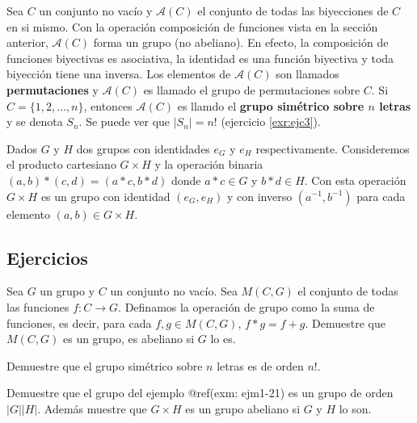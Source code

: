 \documentclass[12pt,]{krantz}
\theoremstyle{definition}
\theoremstyle{definition}
\theoremstyle{definition}
\theoremstyle{remark}
\let\BeginKnitrBlock\begin \let\EndKnitrBlock\end
\begin{document}
\BeginKnitrBlock{example}
\protect\hypertarget{exm:unnamed-chunk-57}{}{\label{exm:unnamed-chunk-57}
}Sea \(C\) un conjunto no vacío y \(\mathcal{A}(C)\) el conjunto de
todas las biyecciones de \(C\) en si mismo. Con la operación composición
de funciones vista en la sección anterior, \(\mathcal{A}(C)\) forma un
grupo (no abeliano). En efecto, la composición de funciones biyectivas
es asociativa, la identidad es una función biyectiva y toda biyección
tiene una inversa. Los elementos de \(\mathcal{A}(C)\) son llamados
\textbf{permutaciones} y \(\mathcal{A}(C)\) es llamado el grupo de
permutaciones sobre \(C\). Si \(C=\{1,2, ..., n\}\), entonces
\(\mathcal{A}(C)\) es llamdo el \textbf{grupo simétrico sobre \(n\)
letras} y se denota \(S_{n}\). Se puede ver que \(|S_{n}|=n!\)
(ejercicio \ref{exr:ejc3}).
\EndKnitrBlock{example}

\BeginKnitrBlock{example}
\protect\hypertarget{exm:ejm1-21}{}{\label{exm:ejm1-21} }Dados \(G\) y \(H\)
dos grupos con identidades \(e_{G}\) y \(e_{H}\) respectivamente.
Consideremos el producto cartesiano \(G\times H\) y la operación binaria
\((a,b)\ast (c,d)=(a\ast c,b\ast d)\) donde \(a\ast c\in G\) y
\(b\ast d\in H\). Con esta operación \(G\times H\) es un grupo con
identidad \((e_{G}, e_{H})\) y con inverso \((a^{-1}, b^{-1})\) para
cada elemento \((a,b)\in G\times H\).
\EndKnitrBlock{example}

\subsection{Ejercicios}\label{ejercicios-1}

\BeginKnitrBlock{exercise}
\protect\hypertarget{exr:unnamed-chunk-58}{}{\label{exr:unnamed-chunk-58}
}Sea \(G\) un grupo y \(C\) un conjunto no vacío. Sea \(M(C,G)\) el
conjunto de todas las funciones \(f:C\longrightarrow G\). Definamos la
operación de grupo como la suma de funciones, es decir, para cada
\(f,g\in M(C,G)\), \(f\ast g = f +g\). Demuestre que \(M(C,G)\) es un
grupo, es abeliano si \(G\) lo es.
\EndKnitrBlock{exercise}

\BeginKnitrBlock{exercise}
\protect\hypertarget{exr:ejc3}{}{\label{exr:ejc3} }Demuestre que el grupo
simétrico sobre \(n\) letras es de orden \(n!\).
\EndKnitrBlock{exercise}

\BeginKnitrBlock{exercise}
\protect\hypertarget{exr:unnamed-chunk-59}{}{\label{exr:unnamed-chunk-59}
}Demuestre que el grupo del ejemplo @ref(exm: ejm1-21) es un grupo de
orden \(|G||H|\). Además muestre que \(G\times H\) es un grupo abeliano
si \(G\) y \(H\) lo son.
\EndKnitrBlock{exercise}
\end{document}
